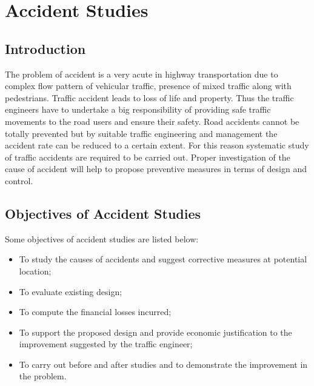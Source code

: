 \chapter{Accident Studies}
\section{Introduction}
The problem of accident is a very acute in highway transportation due to complex flow pattern of vehicular traffic, presence of mixed traffic along with pedestrians. Traffic accident leads to loss of life and property. Thus the traffic engineers have to undertake a big responsibility of providing safe traffic movements to the road users and ensure their safety. Road accidents cannot be totally prevented but by suitable traffic engineering and management the accident rate can be reduced to a certain extent. For this reason systematic study of traffic accidents are required to be carried out. Proper investigation of the cause of accident will help to propose preventive measures in terms of design and control.
\section{Objectives of Accident Studies}
Some objectives of accident studies are listed below:
\begin{itemize}
	\item To study the causes of accidents and suggest corrective measures at potential location;
	\item To evaluate existing design;
	\item To compute the financial losses incurred;
	\item To support the proposed design and provide economic justification to the improvement suggested by the traffic engineer;
	\item To carry out before and after studies and to demonstrate the improvement in the problem.
\end{itemize}
%
